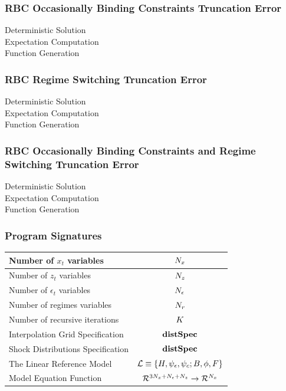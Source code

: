 \documentclass[tikz]{beamer}
\begin{document}
\begin{frame}
  \frametitle{RBC Occasionally Binding Constraints Truncation Error }
  \begin{description}
  \item[Deterministic Solution] 
  \item[Expectation Computation] 
\item[Function Generation]
  \end{description}

\end{frame}


\begin{frame}
  \frametitle{RBC Regime Switching Truncation Error }
  \begin{description}
  \item[Deterministic Solution] 
  \item[Expectation Computation] 
\item[Function Generation]
  \end{description}

\end{frame}



\begin{frame}
  \frametitle{RBC Occasionally Binding Constraints and Regime Switching  Truncation Error }
  \begin{description}
  \item[Deterministic Solution] 
  \item[Expectation Computation] 
\item[Function Generation]
  \end{description}

\end{frame}





\begin{frame}
\frametitle{Program Signatures}
\label{sec:program-listings}
\begin{tabular}{|l|c|}
\hline
Number of $x_t$ variables&${N_x}$\\
\hline
Number of $z_t$ variables&${N_z}$\\
\hline
Number of $\epsilon_t$ variables&${N_\epsilon}$\\
\hline
Number of regimes variables&${N_r}$\\
\hline
Number of recursive iterations&${K}$\\
\hline
Interpolation Grid Specification&${\mathbf{distSpec}}$\\
\hline
Shock Distributions  Specification&${\mathbf{distSpec}}$\\
\hline
The Linear Reference Model&${\mathcal{L}}\equiv{\{H,\psi_\epsilon,\psi_c;B,\phi,F\}}$\\  
\hline
Model Equation Function&${{\mathcal{R}^{3{N_x}+{N_\epsilon}+{N_z}}}\rightarrow{\mathcal{R}^{{N_x}}}}$\\
\hline
\end{tabular}

\end{frame}
\end{document}
